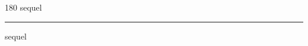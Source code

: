 
\begin{frame}
\begin{center}
\begin{turn}{180}
{\fontsize{2.5cm}{1em}\selectfont sequel}
\end{turn}
\vspace{1em}\par  
\hrule
\vspace{1em}\par  
{\fontsize{2.5cm}{1em}\selectfont sequel}
\end{center}
\end{frame}
